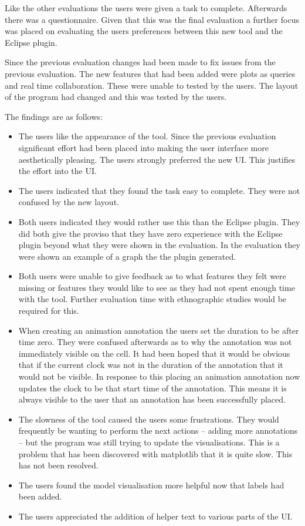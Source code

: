 Like the other evaluations the users were given a task to complete.  Afterwards there was a questionnaire.  Given that this was the final evaluation a further focus was placed on evaluating the users preferences between this new tool and the Eclipse plugin.

Since the previous evaluation changes had been made to fix issues from the previous evaluation.  The new features that had been added were plots as queries and real time collaboration.  These were unable to tested by the users.  The layout of the program had changed and this was tested by the users.

The findings are as follows:

\begin{itemize}
\item The users like the appearance of the tool.  Since the previous evaluation significant effort had been placed into making the user interface more aesthetically pleasing.  The users strongly preferred the new \ac{UI}.  This justifies the effort into the \ac{UI}.
\item The users indicated that they found the task easy to complete.  They were not confused by the new layout.
\item Both users indicated they would rather use this than the Eclipse plugin.  They did both give the proviso that they have zero experience with the Eclipse plugin beyond what they were shown in the evaluation.  In the evaluation they were shown an example of a graph the the plugin generated.
\item Both users were unable to give feedback as to what features they felt were missing or features they would like to see as they had not spent enough time with the tool.  Further evaluation time with ethnographic studies would be required for this.
\item When creating an animation annotation the users set the duration to be after time zero.  They were confused afterwards as to why the annotation was not immediately visible on the cell.  It had been hoped that it would be obvious that if the current clock was not in the duration of the annotation that it would not be visible.  In response to this placing an animation annotation now updates the clock to be that start time of the annotation.  This means it is always visible to the user that an annotation has been successfully placed.
\item The slowness of the tool caused the users some frustrations.  They would frequently be wanting to perform the next actions -- adding more annotations -- but the program was still trying to update the visualisations.  This is a problem that has been discovered with matplotlib that it is quite slow.  This has not been resolved.
\item The users found the model visualisation more helpful now that labels had been added.
\item The users appreciated the addition of helper text to various parts of the \ac{UI}.
\end{itemize}

